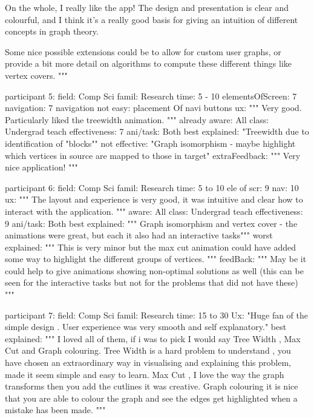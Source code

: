       On the whole, I really like the app! The design and presentation is clear
      and colourful, and I think it's a really good basis for giving an
      intuition of different concepts in graph theory. 

      Some nice possible
      extensions could be to allow for custom user graphs, 
      or provide a bit
      more detail on 
      algorithms to compute these different things like 
      vertex
      covers.
      """

participant 5:
   field: Comp Sci
   famil: Research
   time: 5 - 10
   elementsOfScreen: 7
   navigation: 7
   navigation not easy: placement Of navi buttons
   ux:
      """
      Very good.  Particularly liked the treewidth animation.
      """
   already aware: All
   class: Undergrad
   teach effectiveness: 7
   ani/task: Both
   best explained:
      "Treewidth due to identification of "blocks""
   not effective:
      "Graph isomorphism - maybe highlight which vertices in source are mapped
      to those in target"
   extraFeedback:
      """
      Very nice application!
      """

participant 6:
   field: Comp Sci
   famil: Research
   time: 5 to 10
   ele of scr: 9
   nav: 10
   ux:
      """
      The layout and experience is very good, it was intuitive and clear how to
      interact with the application.
      """
   aware: All
   class: Undergrad
   teach effectiveness: 9
   ani/task: Both
   best explained:
      """
      Graph isomorphism and vertex cover - the animations were great, but
      each it also had an interactive tasks"""
      worst explained:
      """
      This is very minor but the max cut animation could have added some way to
      highlight the different groups of vertices.
      """
   feedBack:
      """
      May be it could help to give animations showing non-optimal solutions as
      well (this can be seen for the interactive tasks but not for the problems
      that did not have these)
      """

participant 7:
   field: Comp Sci
   famil: Research
   time: 15 to 30
   Ux: "Huge fan of the simple design . User experience was very smooth and self explanatory."
   best explained:
      """ I loved all of them, if i was to pick I would say Tree Width , Max
      Cut and Graph colouring. Tree Width is a hard problem to understand , you
      have chosen an extraordinary way in visualising and explaining this
      problem, made it seem simple and easy to learn. Max Cut , I love the way
      the graph transforms then you add the cutlines it was creative. Graph
      colouring it is nice that you are able to colour the graph and see the
      edges get highlighted when a mistake has been made.  """
   
